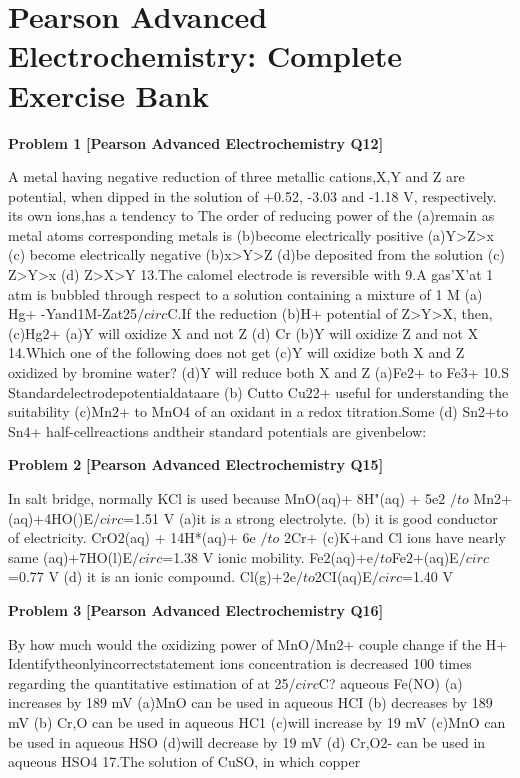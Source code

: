 \chapter{Pearson Advanced Electrochemistry: Complete Exercise Bank}
\label{chap:pearson_all_questions}

\begin{problembox}
\textbf{Problem 1} \hfill \textbf{[Pearson Advanced Electrochemistry Q12]}
\label{q:ext-pearson-1}

A metal having negative reduction
of three metallic cations,X,Y and Z are
potential, when dipped in the solution of
+0.52, -3.03 and -1.18 V, respectively.
its own ions,has a tendency to
The order of reducing power of the
(a)remain as metal atoms
corresponding metals is
(b)become electrically positive
(a)Y>Z>x
(c) become electrically negative
(b)x>Y>Z
(d)be deposited from the solution
(c) Z>Y>x
(d) Z>X>Y
13.The calomel electrode is reversible with
9.A gas'X'at 1 atm is bubbled through
respect to
a solution containing a mixture of 1 M
(a) Hg+
-Yand1M-Zat25$/circ$C.If the reduction
(b)H+
potential of Z>Y>X, then,
(c)Hg$2$+
(a)Y will oxidize X and not Z
(d) Cr
(b)Y will oxidize Z and not X
14.Which one of the following does not get
(c)Y will oxidize both X and Z
oxidized by bromine water?
(d)Y will reduce both X and Z
(a)Fe$2$+ to Fe3+
10.S
Standardelectrodepotentialdataare
(b) Cutto Cu$2$2+
useful for understanding the suitability
(c)Mn$2$+ to MnO4
of an oxidant in a redox titration.Some
(d) Sn2+to Sn4+
half-cellreactions andtheir standard
potentials are givenbelow:
\end{problembox}

\begin{problembox}
\textbf{Problem 2} \hfill \textbf{[Pearson Advanced Electrochemistry Q15]}
\label{q:ext-pearson-2}

In salt bridge, normally KCl is used
because
MnO(aq)+ 8H"(aq) + 5e$2$ $/to$ Mn2+
(aq)+4HO()E$/circ$=1.51 V
(a)it is a strong electrolyte.
(b) it is good conductor of electricity.
CrO$2$(aq) + 14H*(aq)+ 6e $/to$ 2Cr+
(c)K+and Cl ions have nearly same
(aq)+7HO(l)E$/circ$=1.38 V
ionic mobility.
Fe$2$(aq)+e$/to$Fe$2$+(aq)E$/circ$=0.77 V
(d) it is an ionic compound.
Cl(g)+2e$/to$2CI(aq)E$/circ$=1.40 V
\end{problembox}

\begin{problembox}
\textbf{Problem 3} \hfill \textbf{[Pearson Advanced Electrochemistry Q16]}
\label{q:ext-pearson-3}

By how much would the oxidizing power
of MnO/Mn$2$+ couple change if the H+
Identifytheonlyincorrectstatement
ions concentration is decreased 100 times
regarding the quantitative estimation of
at 25$/circ$C?
aqueous Fe(NO)
(a) increases by 189 mV
(a)MnO can be used in aqueous HCI
(b) decreases by 189 mV
(b) Cr,O can be used in aqueous HC1
(c)will increase by 19 mV
(c)MnO can be used in aqueous HSO
(d)will decrease by 19 mV
(d) Cr,O$2$- can be used in aqueous HSO4
17.The solution of CuSO, in which copper
\end{problembox}

